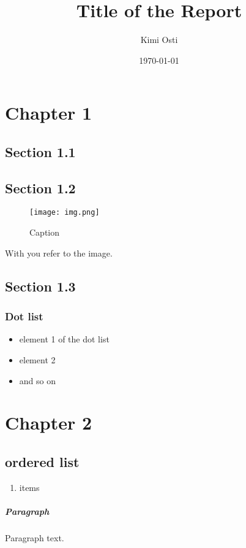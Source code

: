 \documentclass[a4paper,12pt]{report}
\title{Title of the Report}
\author{Kimi Osti}
\date{\today}
\begin{document}
	
	\maketitle
	
	\begin{abstract}
		
	\end{abstract}
	
	\tableofcontents
	
	\chapter{Chapter 1}
	
	
	\section{Section 1.1}
	
	\section{Section 1.2}
	\begin{figure}[H]
		\centering{}
		\texttt{[image: img.png]}
		\caption{Caption}
		\label{img:labelname}
	\end{figure}
	
	With  you refer to the image.
	
	\section{Section 1.3}
	
	\subsection{Dot list}
	
	\begin{itemize}
		\item element 1 of the dot list
		\item element 2
		\item and so on
	\end{itemize}
	
	\chapter{Chapter 2}
	
	\section{ordered list}
	
	\begin{enumerate}
		\item items
	\end{enumerate}
	
	\paragraph{Paragraph} Paragraph text.
	
	
	
	
	
\end{document}
